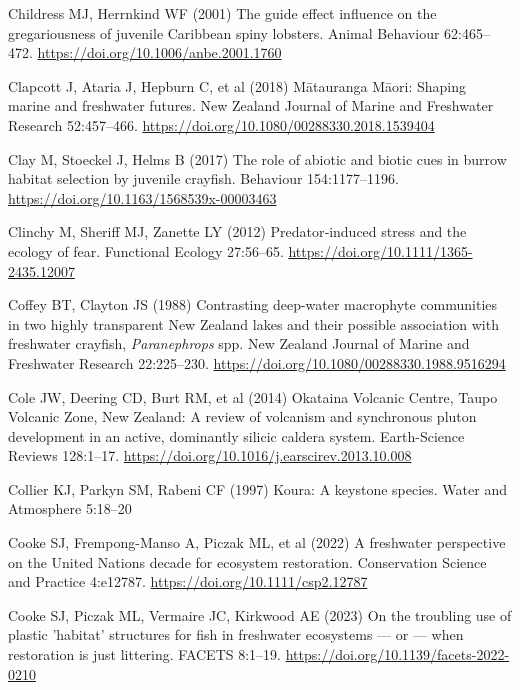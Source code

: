 \documentclass[
  12pt,
  a4paper,
  oneside]{scrbook}
\newlength{\cslhangindent}
\newenvironment{CSLReferences}[2] %
 {\begin{list}{}{%
  \setlength{\itemindent}{0pt}
  \setlength{\leftmargin}{0pt}
  \setlength{\parsep}{0pt}
  \ifodd #1
   \setlength{\leftmargin}{\cslhangindent}
   \setlength{\itemindent}{-1\cslhangindent}
  \fi
  \setlength{\itemsep}{#2\baselineskip}}}
 {\end{list}}
\renewenvironment{CSLReferences}[2]
   {\begin{list}{}{%
    \setlength{\itemindent}{0pt}
    \setlength{\leftmargin}{0pt}
    \setlength{\parsep}{0pt}
    \ifodd #1
     \setlength{\leftmargin}{\cslhangindent}
     \setlength{\itemindent}{-1\cslhangindent}
    \fi
    \setlength{\itemsep}{0.3\baselineskip}}}
   {\end{list}}%
\begin{document}
\begin{CSLReferences}{1}{1}
Childress MJ, Herrnkind WF (2001) The guide effect influence on the
gregariousness of juvenile {Caribbean} spiny lobsters. Animal Behaviour
62:465--472. \url{https://doi.org/10.1006/anbe.2001.1760}

Clapcott J, Ataria J, Hepburn C, et al (2018) {Mātauranga Māori}:
Shaping marine and freshwater futures. New Zealand Journal of Marine and
Freshwater Research 52:457--466.
\url{https://doi.org/10.1080/00288330.2018.1539404}

Clay M, Stoeckel J, Helms B (2017) The role of abiotic and biotic cues
in burrow habitat selection by juvenile crayfish. Behaviour
154:1177--1196. \url{https://doi.org/10.1163/1568539x-00003463}

Clinchy M, Sheriff MJ, Zanette LY (2012) Predator‐induced stress and the
ecology of fear. Functional Ecology 27:56--65.
\url{https://doi.org/10.1111/1365-2435.12007}

Coffey BT, Clayton JS (1988) Contrasting deep-water macrophyte
communities in two highly transparent {New Zealand} lakes and their
possible association with freshwater crayfish, {\emph{Paranephrops}}
spp. New Zealand Journal of Marine and Freshwater Research 22:225--230.
\url{https://doi.org/10.1080/00288330.1988.9516294}

Cole JW, Deering CD, Burt RM, et al (2014) {Okataina Volcanic Centre,
Taupo Volcanic Zone, New Zealand}: A review of volcanism and synchronous
pluton development in an active, dominantly silicic caldera system.
Earth-Science Reviews 128:1--17.
\url{https://doi.org/10.1016/j.earscirev.2013.10.008}

Collier KJ, Parkyn SM, Rabeni CF (1997) Koura: A keystone species. Water
and Atmosphere 5:18--20

Cooke SJ, Frempong-Manso A, Piczak ML, et al (2022) A freshwater
perspective on the {United Nations} decade for ecosystem restoration.
Conservation Science and Practice 4:e12787.
\url{https://doi.org/10.1111/csp2.12787}

Cooke SJ, Piczak ML, Vermaire JC, Kirkwood AE (2023) On the troubling
use of plastic 'habitat' structures for fish in freshwater ecosystems
--- or --- when restoration is just littering. FACETS 8:1--19.
\url{https://doi.org/10.1139/facets-2022-0210}


\end{CSLReferences}
\end{document}
